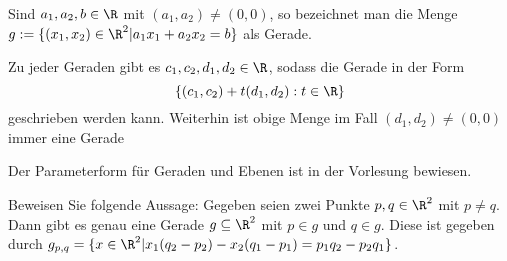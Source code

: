 \begin{Definition}\label{def:line1}
	Sind $a_1,a_2,b\in \R$  mit $(a_1, a_2) \neq (0, 0)$, so bezeichnet man die Menge $g := \{(x_1, x_2) \in \R^2 | a_1x_1 + a_2x_2 = b\}$ als Gerade.
\end{Definition}

\begin{Theorem}
	Zu jeder Geraden gibt es $c_1, c_2, d_1, d_2 \in \R$, sodass die Gerade in der Form
\[\{(c_1, c_2) + t(d_1, d_2) : t \in \R\}\]
geschrieben werden kann. Weiterhin ist obige Menge im Fall $(d_1, d_2) \neq  (0, 0)$ immer eine Gerade
\end{Theorem}

\begin{Remark}
	Der Parameterform f\"{u}r Geraden und Ebenen ist in der Vorlesung bewiesen.
\end{Remark}
\begin{Problem}\label{pr:linalg1-3}
	Beweisen Sie folgende Aussage:
Gegeben seien zwei Punkte $p, q \in \R^2$ mit $p \neq  q$. Dann gibt es genau eine Gerade $g \subseteq \R^2$ mit $p \in g$ und $q \in g$. Diese ist gegeben durch $g_{p,q} = \{x \in \R^2 |x_1 (q_2 - p_2 ) - x_2(q_1 - p_1 ) = p_1q_2-  p_2q_1\}$.
\end{Problem}

